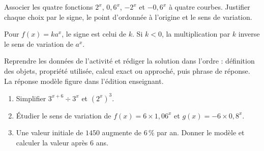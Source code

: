 \begin{activite}
Associer les quatre fonctions $2^x$, $0{,}6^x$, $-2^x$ et $-0{,}6^x$ à quatre courbes. Justifier chaque choix par le signe, le point d'ordonnée à l'origine et le sens de variation.
\begin{center}\end{center}
\end{activite}

\begin{traceecrite}Pour $f(x)=ka^x$, le signe est celui de $k$. Si $k<0$, la multiplication par $k$ inverse le sens de variation de $a^x$.\end{traceecrite}

\begin{exemple}
Reprendre les données de l'activité et rédiger la solution dans l'ordre : définition des objets, propriété utilisée, calcul exact ou approché, puis phrase de réponse. La réponse modèle figure dans l'édition enseignant.
\end{exemple}

\begin{exercice}[-- essentiel]
\begin{enumerate}\item Simplifier $3^{x+6}\div3^x$ et $(2^x)^3$.\item Étudier le sens de variation de $f(x)=6\times1{,}06^x$ et $g(x)=-6\times0{,}8^x$.\item Une valeur initiale de $1450$ augmente de $6\,\%$ par an. Donner le modèle et calculer la valeur après $6$ ans.\end{enumerate}
\end{exercice}

